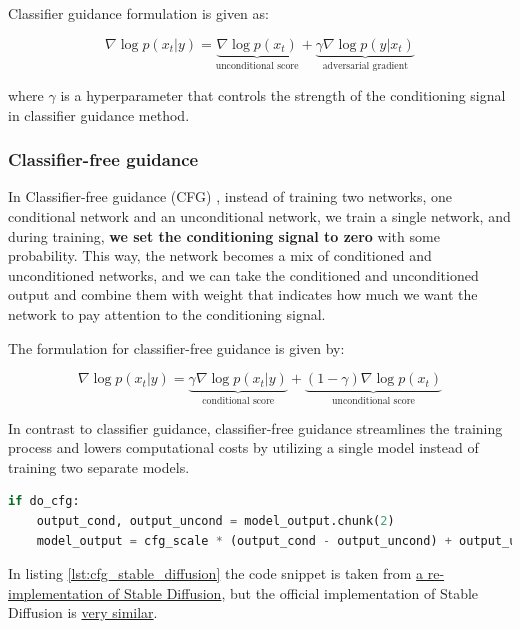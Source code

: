 Classifier guidance formulation is given as:

\[
\nabla \log p(x_t | y) = \underbrace{\nabla \log p(x_t)}_{\text{unconditional score}} + \underbrace{\gamma \nabla \log p(y | x_t)}_{\text{adversarial gradient}}
\]

where $\gamma$ is a hyperparameter that controls the strength of the conditioning signal in classifier guidance method.








\subsubsection*{Classifier-free guidance}

In Classifier-free guidance (CFG) \cite{classifier_free_guidance}, instead of training two networks, one conditional network and an unconditional network, we train a single network, and during training, \textbf{we set the conditioning signal to zero} with some probability. This way, the network becomes a mix of conditioned and unconditioned networks, and we can take the conditioned and unconditioned output and combine them with weight that indicates how much we want the network to pay attention to the conditioning signal. 

The formulation for classifier-free guidance is given by:

\[
\nabla \log p(x_t | y) = \underbrace{\gamma \nabla \log p(x_t | y)}_{\text{conditional score}} + \underbrace{(1 - \gamma) \nabla \log p(x_t)}_{\text{unconditional score}}
\]

In contrast to classifier guidance, classifier-free guidance streamlines the training process and lowers computational costs by utilizing a single model instead of training two separate models.

\begin{lstlisting}[language=Python, caption={Classifier-free guidance (CFG) in Stable Diffusion.}, label={lst:cfg_stable_diffusion}]
if do_cfg:
    output_cond, output_uncond = model_output.chunk(2)
    model_output = cfg_scale * (output_cond - output_uncond) + output_uncond
\end{lstlisting}

In listing \ref{lst:cfg_stable_diffusion} the code snippet is taken from \href{https://github.com/hkproj/pytorch-stable-diffusion/blob/e0cb06de011787cdf13eed7b4287ad8410491149/sd/pipeline.py#L135C1-L136C1}{a re-implementation of Stable Diffusion}, but the official implementation of Stable Diffusion is \href{https://github.com/CompVis/stable-diffusion/blob/21f890f9da3cfbeaba8e2ac3c425ee9e998d5229/ldm/models/diffusion/ddim.py#L178C1-L179C1}{very similar}.

















